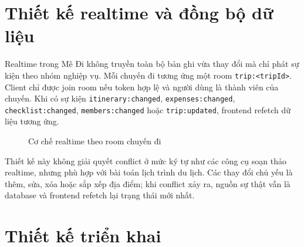 \documentclass[a4paper]{report}
\newcommand{\ProjectName}{Mê Đi}
\begin{document}
\section{Thiết kế realtime và đồng bộ dữ liệu}

Realtime trong \ProjectName{} không truyền toàn bộ bản ghi vừa thay đổi mà chỉ phát sự kiện theo nhóm nghiệp vụ. Mỗi chuyến đi tương ứng một room \texttt{trip:<tripId>}. Client chỉ được join room nếu token hợp lệ và người dùng là thành viên của chuyến. Khi có sự kiện \texttt{itinerary:changed}, \texttt{expenses:changed}, \texttt{checklist:changed}, \texttt{members:changed} hoặc \texttt{trip:updated}, frontend refetch dữ liệu tương ứng.

\begin{figure}[H]
\centering
{}
\caption{Cơ chế realtime theo room chuyến đi}
\label{fig:realtime-flow}
\end{figure}

Thiết kế này không giải quyết conflict ở mức ký tự như các công cụ soạn thảo realtime, nhưng phù hợp với bài toán lịch trình du lịch. Các thay đổi chủ yếu là thêm, sửa, xóa hoặc sắp xếp địa điểm; khi conflict xảy ra, nguồn sự thật vẫn là database và frontend refetch lại trạng thái mới nhất.

\section{Thiết kế triển khai}
\end{document}
